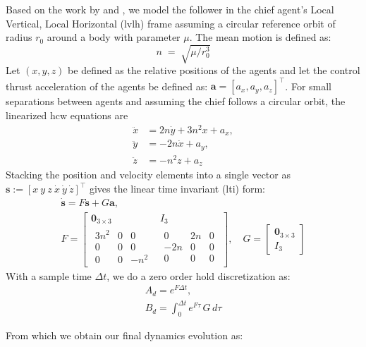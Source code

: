 Based on the work by \cite{clohessy1960terminal} and \cite{hill1878researches}, we model the follower in the chief agent's Local Vertical, Local Horizontal (\acs{lvlh}) frame assuming a circular reference orbit of radius $r_0$ around a body with parameter $\mu$. The mean motion is defined as:
\[
n \;=\; \sqrt{\mu / r_0^3}
\]
Let $(x,y,z)$ be defined as the relative positions of the agents and let the control thrust acceleration of the agents be defined as:
$\mathbf{a} = [a_x, a_y, a_z]^\top$.
For small separations between agents and assuming the chief follows a circular orbit, the linearized \acs{hcw} equations are
\begin{align*}
\ddot{x} &= 2n \dot{y} + 3n^2 x  + a_x, \\
\ddot{y} &= - 2n \dot{x}            + a_y, \\
\ddot{z} &= - n^2 z                  + a_z
\end{align*}
Stacking the position and velocity elements into a single vector as 
$\mathbf{s} := [x\ y\ z\ \dot{x}\ \dot{y}\ \dot{z}]^\top$
gives the linear time invariant (\acs{lti}) form:
\begin{gather*}
\dot{\mathbf{s}} = F\mathbf{s} + G\mathbf{a},\\[4pt]
F =
\begin{bmatrix}
\mathbf{0}_{3\times3} & I_3\\[4pt]
\begin{array}{ccc}
3n^2 & 0   & 0\\
0    & 0   & 0\\
0    & 0   & -n^2
\end{array} &
\begin{array}{ccc}
0 & 2n & 0\\
-2n & 0 & 0\\
0 & 0 & 0
\end{array}
\end{bmatrix},
\quad
G =
\begin{bmatrix}
\mathbf{0}_{3\times3}\\[2pt]
I_3
\end{bmatrix}
\end{gather*}
With a sample time $\Delta t$, we do a zero order hold discretization as:
\begin{gather*}
A_d = e^{F\Delta t},\\[4pt]
B_d = \int_{0}^{\Delta t} e^{F\tau}\,G\,d\tau
\end{gather*}

From which we obtain our final dynamics evolution as:


